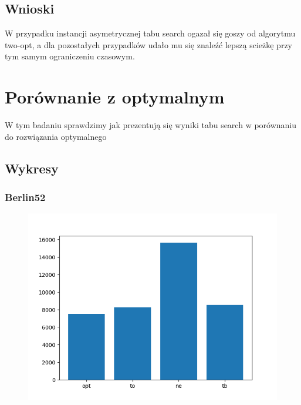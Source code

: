 \documentclass[11pt]{article}
\begin{document}
    \subsection{Wnioski }
        W przypadku instancji asymetrycznej tabu search ogazał się goszy od algorytmu two-opt, 
        a dla pozostałych przypadków udało mu się znaleźć lepszą scieżkę przy tym samym ograniczeniu czasowym.


\section{Porównanie z optymalnym }
    W tym badaniu sprawdzimy jak prezentują się wyniki tabu search w porównaniu do rozwiązania optymalnego
    \subsection{Wykresy}
        \subsubsection{Berlin52}
            \begin{center}
            \begin{figure}[H]

                \includegraphics[scale=0.6]{berlin52.png}

            \end{figure}
            \end{center}
\end{document}
